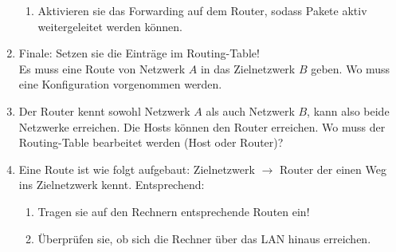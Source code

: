 \documentclass[paper=a4,fontsize=11pt]{scrartcl}%
\begin{document}
\begin{enumerate}
\begin{enumerate}
		\item Aktivieren sie das Forwarding auf dem Router, sodass Pakete aktiv weitergeleitet werden können.
		\end{enumerate}
		\item Finale: Setzen sie die Einträge im Routing-Table!\\
		Es muss eine Route von Netzwerk $A$ in das Zielnetzwerk $B$ geben. Wo muss eine Konfiguration vorgenommen werden.
		\item Der Router kennt sowohl Netzwerk $A$ als auch Netzwerk $B$, kann also beide Netzwerke erreichen. Die Hosts können den Router erreichen. Wo muss der Routing-Table bearbeitet werden (Host oder Router)?
		\item Eine Route ist wie folgt aufgebaut: Zielnetzwerk $\to$ Router der einen Weg ins Zielnetzwerk kennt. Entsprechend:
		\begin{enumerate}
			\item Tragen sie auf den Rechnern entsprechende Routen ein!
			\item Überprüfen sie, ob sich die Rechner über das LAN hinaus erreichen.
		\end{enumerate}
\end{enumerate}
\end{document}
